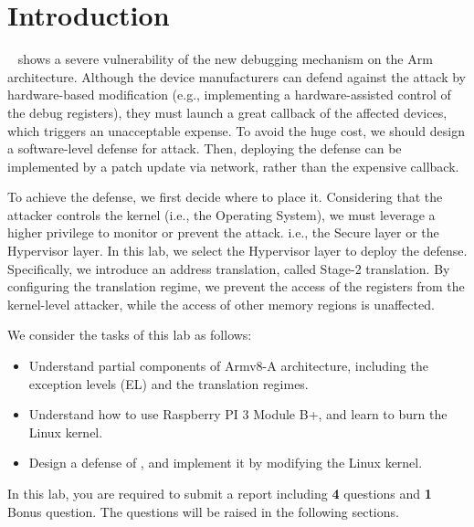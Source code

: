 \section{Introduction}
\label{sec:intro}


\TheName{}~\cite{ning2019understanding} shows a severe vulnerability of the new debugging mechanism on the Arm architecture.
Although the device manufacturers can defend against the attack by hardware-based modification (e.g., implementing a hardware-assisted control of the debug registers),
they must launch a great callback of the affected devices, which triggers an unacceptable expense.
To avoid the huge cost, we should design a software-level defense for \TheName{} attack.
Then, deploying the defense can be implemented by a patch update via network, rather than the expensive callback.

To achieve the defense, we first decide where to place it.
Considering that the attacker controls the kernel (i.e., the Operating System),
we must leverage a higher privilege to monitor or prevent the \TheName{} attack. i.e., the Secure layer or the Hypervisor layer.
In this lab, we select the Hypervisor layer to deploy the defense. Specifically, we introduce an address translation, called Stage-2 translation. By configuring the translation regime, we prevent the access of the registers from the kernel-level attacker, while the access of other memory regions is unaffected.

We consider the tasks of this lab as follows:

\begin{itemize}
	\item Understand partial components of Armv8-A architecture, including the exception levels (EL) and the translation regimes.
	\item Understand how to use Raspberry PI 3 Module B+, and learn to burn the Linux kernel.
	\item Design a defense of \TheName{}, and implement it by modifying the Linux kernel. 
\end{itemize}

In this lab, you are required to submit a report including \textbf{4} 
questions and \textbf{1} Bonus question. The questions will 
be raised in the following sections.